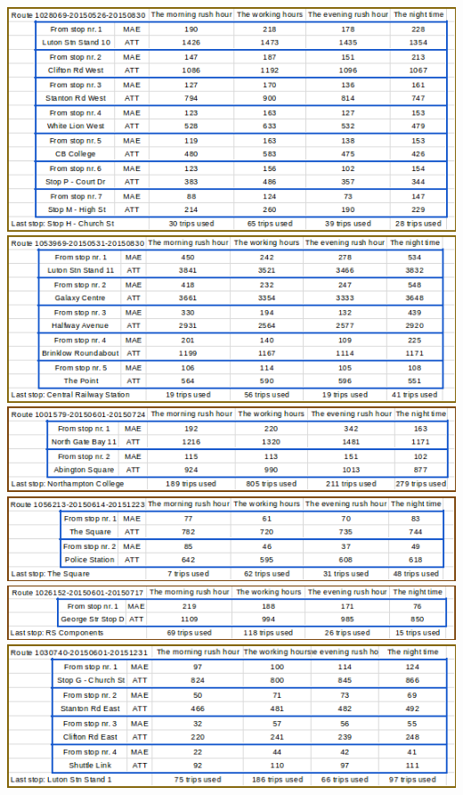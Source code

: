 \documentclass[12pt,a4paper,oneside,openright]{report}
\begin{document}
\includegraphics[width=\textwidth]{figs/table_of_1028069.png}
\includegraphics[width=\textwidth]{figs/table_of_1053969.png}
\includegraphics[width=\textwidth]{figs/table_of_1001579.png}
\includegraphics[width=\textwidth]{figs/table_of_1056213.png}
\includegraphics[width=\textwidth]{figs/table_of_1026152.png}
\includegraphics[width=\textwidth]{figs/table_of_1030740.png}
\end{document}
